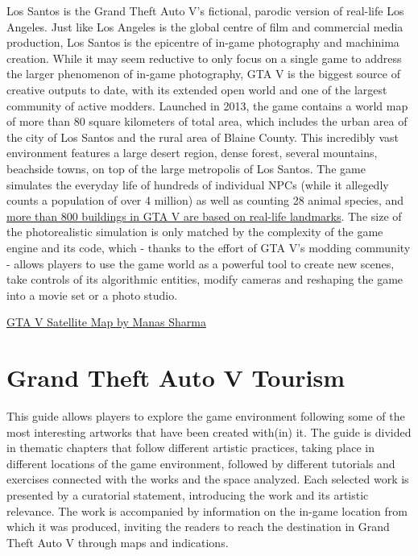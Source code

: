 \documentclass[
  openany]{book}
\begin{document}
Los Santos is the Grand Theft Auto V's fictional, parodic version of real-life Los Angeles. Just like Los Angeles is the global centre of film and commercial media production, Los Santos is the epicentre of in-game photography and machinima creation. While it may seem reductive to only focus on a single game to address the larger phenomenon of in-game photography, GTA V is the biggest source of creative outputs to date, with its extended open world and one of the largest community of active modders. Launched in 2013, the game contains a world map of more than 80 square kilometers of total area, which includes the urban area of the city of Los Santos and the rural area of Blaine County. This incredibly vast environment features a large desert region, dense forest, several mountains, beachside towns, on top of the large metropolis of Los Santos. The game simulates the everyday life of hundreds of individual NPCs (while it allegedly counts a population of over 4 million) as well as counting 28 animal species, and \href{https://grandtheftdata.com/landmarks/\#0,0,2,satellite}{more than 800 buildings in GTA V are based on real-life landmarks}. The size of the photorealistic simulation is only matched by the complexity of the game engine and its code, which - thanks to the effort of GTA V's modding community - allows players to use the game world as a powerful tool to create new scenes, take controls of its algorithmic entities, modify cameras and reshaping the game into a movie set or a photo studio.

\href{https://www.bragitoff.com/2015/11/gta-v-maps-quad-ultra-high-definition-8k-quality/gtav_satellite_2048x2048/}{GTA V Satellite Map by Manas Sharma}

\hypertarget{grand-theft-auto-v-tourism}{%
\section{Grand Theft Auto V Tourism}\label{grand-theft-auto-v-tourism}}

This guide allows players to explore the game environment following some of the most interesting artworks that have been created with(in) it. The guide is divided in thematic chapters that follow different artistic practices, taking place in different locations of the game environment, followed by different tutorials and exercises connected with the works and the space analyzed.
Each selected work is presented by a curatorial statement, introducing the work and its artistic relevance. The work is accompanied by information on the in-game location from which it was produced, inviting the readers to reach the destination in Grand Theft Auto V through maps and indications.
\end{document}
